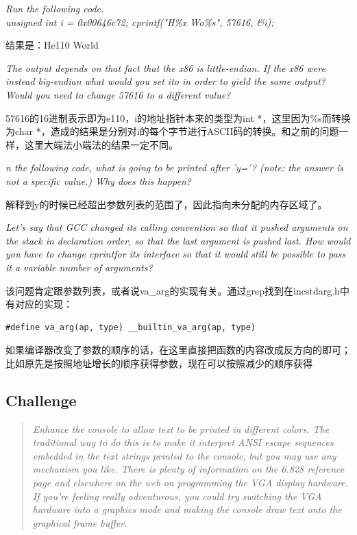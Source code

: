 \begin{description}
\begin{enumerate}
\end{enumerate}

\item[Question 3] \textit{Run the following code.\\
unsigned int i = 0x00646c72; cprintf("H\%x Wo\%s", 57616, \&i);}

结果是：He110 World

\item \textit{The output depends on that fact that the x86 is little-endian. If the x86 were instead big-endian what would you set ito in order to yield the same output? Would you need to change 57616 to a different value?}

57616的16进制表示即为e110，i的地址指针本来的类型为int *，这里因为\%s而转换为char *，造成的结果是分别对i的每个字节进行ASCII码的转换。和之前的问题一样，这里大端法小端法的结果一定不同。

\item[Question 5] \textit{n the following code, what is going to be printed after 'y='? (note: the answer is not a specific value.) Why does this happen?}

解释到y的时候已经超出参数列表的范围了，因此指向未分配的内存区域了。

\item[Question 6] \textit{Let's say that GCC changed its calling convention so that it pushed arguments on the stack in declaration order, so that the last argument is pushed last. How would you have to change cprintfor its interface so that it would still be possible to pass it a variable number of arguments?}

该问题肯定跟参数列表，或者说va\_arg的实现有关。通过grep找到在inc\/stdarg.h中有对应的实现：\\
\begin{lstlisting}
#define va_arg(ap, type) __builtin_va_arg(ap, type)
\end{lstlisting}
如果编译器改变了参数的顺序的话，在这里直接把函数的内容改成反方向的即可；比如原先是按照地址增长的顺序获得参数，现在可以按照减少的顺序获得

\end{description}

\subsection{Challenge} 
\begin{quote} \textit{Enhance the console to allow text to be printed in different colors. The traditional way to do this is to make it interpret ANSI escape sequences embedded in the text strings printed to the console, but you may use any mechanism you like. There is plenty of information on the 6.828 reference page and elsewhere on the web on programming the VGA display hardware. If you're feeling really adventurous, you could try switching the VGA hardware into a graphics mode and making the console draw text onto the graphical frame buffer.} \end{quote}

